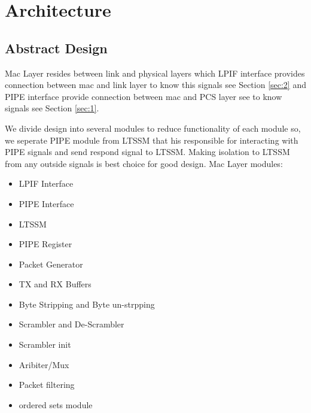 \chapter{Architecture}
\label{4}
 \section{Abstract Design}
  Mac Layer resides between link and physical layers which LPIF interface provides connection between mac and link layer to know this signals see Section  \ref{sec:2} and PIPE interface provide connection between mac and PCS layer see to know signals see Section \ref{sec:1}. \newline
  
 We divide design into several modules to reduce functionality of each module so, we seperate PIPE module from LTSSM that his responsible for interacting with PIPE signals and send respond signal to LTSSM. Making isolation to LTSSM from any outside signals is best choice for good design. \newline
 Mac Layer modules:
 \begin{itemize}
     \item LPIF Interface
     \item PIPE Interface
     \item LTSSM 
     \item PIPE Register 
     \item Packet Generator 
     \item TX and RX Buffers
     \item  Byte Stripping and Byte un-strpping
     \item Scrambler and De-Scrambler
     \item Scrambler init
     \item Aribiter/Mux
     \item Packet filtering 
     \item ordered sets module
 \end{itemize}
